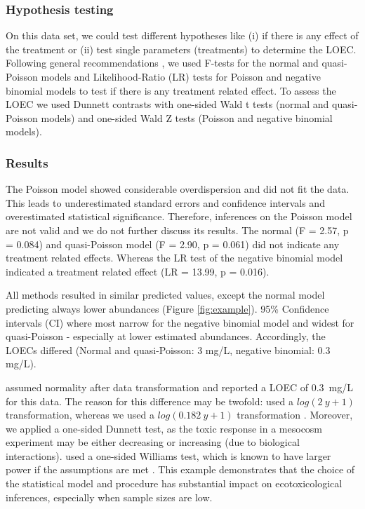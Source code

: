\documentclass{scrartcl}
\begin{document}
\subsubsection{Hypothesis testing}
On this data set, we could test different hypotheses like (i) if there is any effect of the treatment or (ii) test single parameters (treatments) to determine the LOEC.
Following general recommendations \citep{bolker_generalized_2009}, we used F-tests for the normal and quasi-Poisson models and Likelihood-Ratio (LR) tests for Poisson and negative binomial models to test if there is any treatment related effect.
To assess the LOEC we used Dunnett contrasts with one-sided Wald t tests (normal and quasi-Poisson models) and one-sided Wald Z tests (Poisson and negative binomial models).


\subsubsection{Results}
The Poisson model showed considerable overdispersion and did not fit the data. 
This leads to underestimated standard errors and confidence intervals and overestimated statistical significance.
Therefore, inferences on the Poisson model are not valid and we do not further discuss its results.
The normal (F = 2.57, p = 0.084) and quasi-Poisson model (F = 2.90, p = 0.061) did not indicate any treatment related effects.
Whereas the LR test of the negative binomial model indicated a treatment related effect (LR = 13.99, p = 0.016).

All methods resulted in similar predicted values, except the normal model predicting always lower abundances (Figure \ref{fig:example}). 
95\% Confidence intervals (CI) where most narrow for the negative binomial model and widest for quasi-Poisson - especially at lower estimated abundances.
Accordingly, the LOECs differed (Normal and quasi-Poisson: 3 mg/L, negative binomial: 0.3 mg/L).

\citet{brock_minimum_2015} assumed normality after data transformation and reported a LOEC of \mbox{0.3 mg/L} for this data.
The reason for this difference may be twofold: \citep{brock_minimum_2015} used a $log(2~y + 1)$ transformation, whereas we used a $log(0.182~y + 1)$ transformation \citep{van_den_brink_impact_2000}.
Moreover, we applied a one-sided Dunnett test, as the toxic response in a mesocosm experiment may be either decreasing or increasing (due to biological interactions).
\citet{brock_minimum_2015} used a one-sided Williams test, which is known to have larger power if the assumptions are met \citep{jaki_statistical_2013}.
This example demonstrates that the choice of the statistical model and procedure has substantial impact on ecotoxicological inferences, especially when sample sizes are low.
\end{document}
